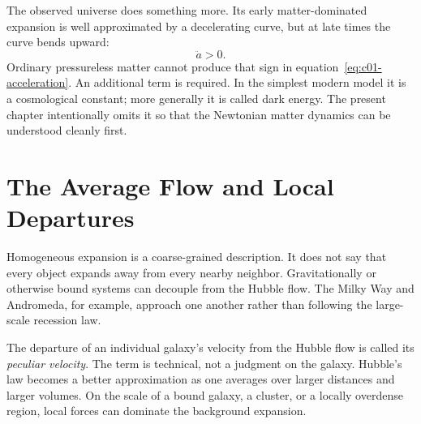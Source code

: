 The observed universe does something more. Its early matter-dominated expansion is well approximated by a decelerating curve, but at late times the curve bends upward:
\begin{equation}
\ddot a>0.
\end{equation}
Ordinary pressureless matter cannot produce that sign in equation~\eqref{eq:c01-acceleration}. An additional term is required. In the simplest modern model it is a cosmological constant; more generally it is called dark energy. The present chapter intentionally omits it so that the Newtonian matter dynamics can be understood cleanly first.

\begin{classroomqa}
\end{classroomqa}

\section{The Average Flow and Local Departures}

Homogeneous expansion is a coarse-grained description. It does not say that every object expands away from every nearby neighbor. Gravitationally or otherwise bound systems can decouple from the Hubble flow. The Milky Way and Andromeda, for example, approach one another rather than following the large-scale recession law.

The departure of an individual galaxy's velocity from the Hubble flow is called its \emph{peculiar velocity}. The term is technical, not a judgment on the galaxy. Hubble's law becomes a better approximation as one averages over larger distances and larger volumes. On the scale of a bound galaxy, a cluster, or a locally overdense region, local forces can dominate the background expansion.

\begin{classroomqa}
\end{classroomqa}

